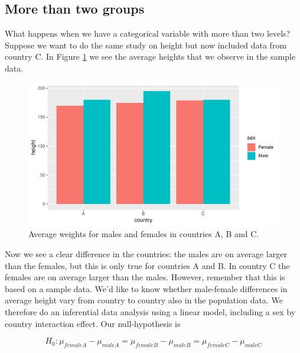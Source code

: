 \documentclass[]{report}\usepackage[]{graphicx}\usepackage[]{color}
\makeatletter
\def\maxwidth{ %
  \ifdim\Gin@nat@width>\linewidth
    \linewidth
  \else
    \Gin@nat@width
  \fi
}
\newenvironment{knitrout}{}{} %
\makeatother
\begin{document}
\subsection{More than two groups}

What happens when we have a categorical variable with more than two levels? Suppose we want to do the same study on height but now included data from country C. In Figure \ref{fig:country_sex3} we see the average heights that we observe in the sample data.

\begin{knitrout}
\color{fgcolor}\begin{figure}

{\centering \includegraphics[width=\maxwidth]{figure/country_sex3-1} 

}

\caption[Average weights for males and females in countries A, B and C]{Average weights for males and females in countries A, B and C.}\label{fig:country_sex3}
\end{figure}


\end{knitrout}

Now we see a clear difference in the countries: the males are on average larger than the females, but this is only true for countries A and B. In country C the females are on average larger than the males. However, remember that this is based on a sample data. We'd like to know whether male-female differences in average height vary from country to country also in the population data. We therefore do an inferential data analysis using a linear model, including a sex by country interaction effect. Our null-hypothesis is 

\begin{equation}
H_0: \mu_{femaleA}-\mu_{maleA}=\mu_{femaleB}-\mu_{maleB}=\mu_{femaleC}-\mu_{maleC}
\end{equation}
\end{document}

